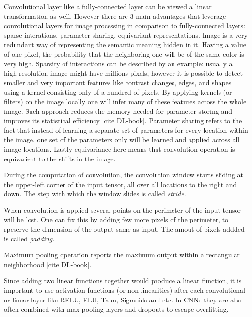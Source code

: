 Convolutional layer like a fully-connected layer can be viewed a linear transformation as well. However there are 3 main advantages that leverage convolutional layers for image processing in comparison to fully-connected layers: sparse interations, parameter sharing, equivariant representations. Image is a very redundant way of representing the semantic meaning hidden in it. Having a value of one pixel, the probability that the neighboring one will be of the same color is very high. Sparsity of interactions can be described by an example: usually a high-resolution image might have millions pixels, however it is possible to detect smaller and very important features like contrast changes, edges, and shapes using a kernel consisting only of a hundred of pixels. By applying kernels (or filters) on the image locally one will infer many of these features across the whole image. Such approach reduces the memory needed for parameter storing and improves its statistical eﬃciency [cite DL-book]. Parameter sharing refers to the fact that instead of learning a separate set of parameters for every location within the image, one set of the parameters only will be learned and applied across all image locations. Lastly equivariance here means that convolution operation is equivarient to the shifts in the image.

\begin{definition}[Stride]
	During the computation of convolution, the convolution window starts sliding at the upper-left corner of the input tensor, all over all locations to the right and down. The step with which the window slides is called \textit{stride}. 
\end{definition}

\begin{definition}[Padding]
	When convolution is applied several points on the perimeter of the input tensor will be lost. One can fix this by adding few more pixels of the perimeter, to rpeserve the dimension of the output same as input. The amout of pixels addded is called
	\textit{padding}. 
\end{definition}

\begin{definition}
	Maximum pooling operation reports the maximum output within a rectangular neighborhood [cite DL-book].
\end{definition}


Since adding two linear functions together would produce a linear function, it is important to use activation functions (or non-linearities) after each convolutional or linear layer like RELU, ELU, Tahn, Sigmoids and etc. In CNNs they are also often combined with max pooling layers and dropouts to escape overfitting. 

